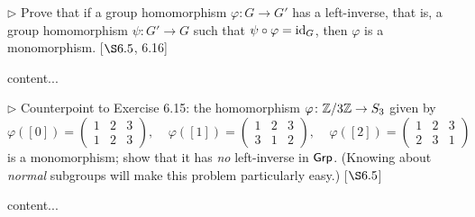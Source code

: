\begin{exercise}
	$\triangleright$ Prove that if a group homomorphism $\varphi \colon G \to G'$ has a left-inverse, that is, a group homomorphism $\psi \colon G'\to G$ such that $\psi\circ\varphi = \operatorname{id}_G$, then $\varphi$ is a monomorphism. [$\S 6.5$, 6.16]
\end{exercise}
\begin{solution}
	content...
\end{solution}

\begin{exercise}
	$\triangleright$ Counterpoint to Exercise 6.15: the homomorphism $\varphi\colon \mathbb{Z}/3\mathbb{Z} \to S_3$ given by
	\[
		\varphi([0]) = 
		\begin{pmatrix}
			1 & 2 & 3\\
			1 & 2 & 3
		\end{pmatrix}, 
		\;\;\;\;
		\varphi([1]) = 
		\begin{pmatrix}
			1 & 2 & 3\\
			3 & 1 & 2
		\end{pmatrix}, 
		\;\;\;\;
		\varphi([2]) = 
		\begin{pmatrix}
			1 & 2 & 3\\
			2 & 3 & 1
		\end{pmatrix}
	\]
	is a monomorphism; show that it has \emph{no} left-inverse in $\textsf{Grp}$. (Knowing about \emph{normal} subgroups will make this problem particularly easy.) [$\S 6.5$]
\end{exercise}
\begin{solution}
	content...
\end{solution}
